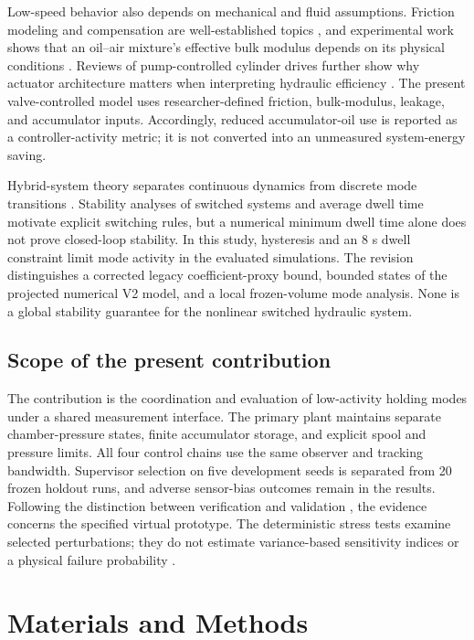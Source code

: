 \documentclass[machines,article,submit,pdftex,moreauthors]{Definitions/mdpi}
\begin{document}
Low-speed behavior also depends on mechanical and fluid assumptions. Friction modeling and compensation are well-established topics \cite{wit1995,olsson1998}, and experimental work shows that an oil--air mixture's effective bulk modulus depends on its physical conditions \cite{gholizadeh2013}. Reviews of pump-controlled cylinder drives further show why actuator architecture matters when interpreting hydraulic efficiency \cite{ketelsen2019}. The present valve-controlled model uses researcher-defined friction, bulk-modulus, leakage, and accumulator inputs. Accordingly, reduced accumulator-oil use is reported as a controller-activity metric; it is not converted into an unmeasured system-energy saving.

Hybrid-system theory separates continuous dynamics from discrete mode transitions \cite{goebel2009}. Stability analyses of switched systems \cite{liberzon1999} and average dwell time \cite{hespanha1999} motivate explicit switching rules, but a numerical minimum dwell time alone does not prove closed-loop stability. In this study, hysteresis and an 8 s dwell constraint limit mode activity in the evaluated simulations. The revision distinguishes a corrected legacy coefficient-proxy bound, bounded states of the projected numerical V2 model, and a local frozen-volume mode analysis. None is a global stability guarantee for the nonlinear switched hydraulic system.

\subsection{Scope of the present contribution}
The contribution is the coordination and evaluation of low-activity holding modes under a shared measurement interface. The primary plant maintains separate chamber-pressure states, finite accumulator storage, and explicit spool and pressure limits. All four control chains use the same observer and tracking bandwidth. Supervisor selection on five development seeds is separated from 20 frozen holdout runs, and adverse sensor-bias outcomes remain in the results. Following the distinction between verification and validation \cite{sargent2013}, the evidence concerns the specified virtual prototype. The deterministic stress tests examine selected perturbations; they do not estimate variance-based sensitivity indices or a physical failure probability \cite{saltelli2010}.


\section{Materials and Methods}
\end{document}
